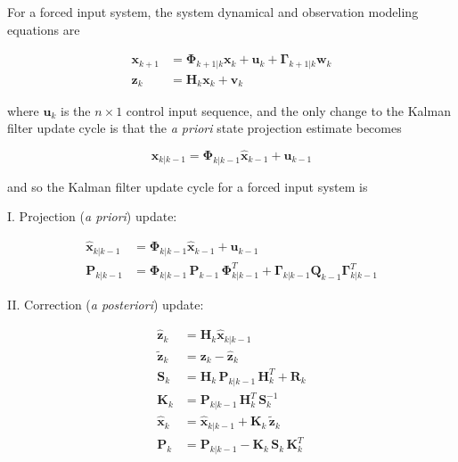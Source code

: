 \documentclass[12pt]{article}
\begin{document}
For a forced input system, the system dynamical and observation modeling equations are

\begin{equation*}
    \begin{aligned}
        \mathbf{x}_{k+1} &= \mathbf{\Phi}_{k+1|k} \mathbf{x}_k + \mathbf{u}_k + \mathbf{\Gamma}_{k+1|k} \mathbf{w}_k \\
        \mathbf{z}_k &= \mathbf{H}_k \mathbf{x}_k + \mathbf{v}_k
    \end{aligned}
\end{equation*}

where $\mathbf{u}_k$ is the $n \times 1$ control input sequence, and the only change to
the Kalman filter update cycle is that the \textit{a priori} state projection estimate becomes

\begin{equation*}
    \hat{\mathbf{x}}_{k|k-1} = \mathbf{\Phi}_{k|k-1} \hat{\mathbf{x}}_{k-1} + \mathbf{u}_{k-1}
\end{equation*}

and so the Kalman filter update cycle for a forced input system is

I. Projection (\textit{a priori}) update:

\begin{equation*}
    \begin{aligned}
        \hat{\mathbf{x}}_{k|k-1} &= \mathbf{\Phi}_{k|k-1} \hat{\mathbf{x}}_{k-1} + \mathbf{u}_{k-1} \\
        \mathbf{P}_{k|k-1} &= \mathbf{\Phi}_{k|k-1} \, \mathbf{P}_{k-1} \, \mathbf{\Phi}_{k|k-1}^T + \mathbf{\Gamma}_{k|k-1} \mathbf{Q}_{k-1} \mathbf{\Gamma}_{k|k-1}^T
    \end{aligned}
\end{equation*}

II. Correction (\textit{a posteriori}) update:

\begin{equation*}
    \begin{aligned}
        \hat{\mathbf{z}}_k &= \mathbf{H}_k \hat{\mathbf{x}}_{k|k-1} \\
        \tilde{\mathbf{z}}_k &= \mathbf{z}_k - \hat{\mathbf{z}}_k \\
        \mathbf{S}_{k} &= \mathbf{H}_{k} \, \mathbf{P}_{k|k-1} \, \mathbf{H}_{k}^T + \mathbf{R}_{k} \\
        \mathbf{K}_{k} &= \mathbf{P}_{k|k-1} \, \mathbf{H}_{k}^T \, \mathbf{S}_{k}^{-1} \\
        \hat{\mathbf{x}}_k &= \hat{\mathbf{x}}_{k|k-1} +\mathbf{K}_k \, \tilde{\mathbf{z}}_k \\
        \mathbf{P}_k &= \mathbf{P}_{k|k-1} - \mathbf{K}_{k} \, \mathbf{S}_{k} \, \mathbf{K}_{k}^T
    \end{aligned}
\end{equation*}
\end{document}

